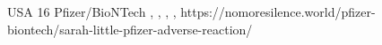           {USA}
          {16}
          {Pfizer/BioNTech}
          {}
          {
            ,
            ,
            ,
            ,
          }
          {https://nomoresilence.world/pfizer-biontech/sarah-little-pfizer-adverse-reaction/}


